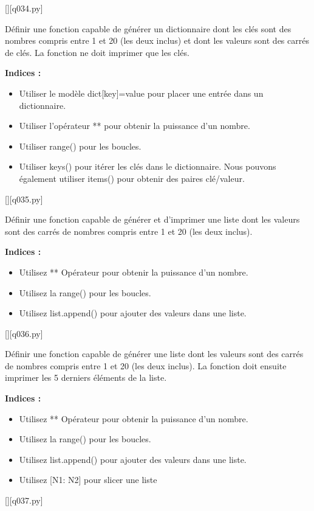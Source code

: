 \renewcommand{\nomfichier}{q034.py}
\begin{solution}
    \pythonfile{\chemincode \nomfichier}[][\nomfichier]
\end{solution}

\question
Définir une fonction capable de générer un dictionnaire dont les clés sont des nombres compris entre 1 et 20 (les deux inclus) et dont les valeurs sont des carrés de clés. La fonction ne doit imprimer que les clés.
\par
\textbf{Indices : }
\begin{itemize}
	\item Utiliser le modèle dict[key]=value pour placer une entrée dans un dictionnaire.
	\item Utiliser l'opérateur ** pour obtenir la puissance d'un nombre.
	\item Utiliser range() pour les boucles.
	\item Utiliser keys() pour itérer les clés dans le dictionnaire. Nous pouvons également utiliser items() pour obtenir des paires clé/valeur.
\end{itemize}
\renewcommand{\nomfichier}{q035.py}
\begin{solution}
    \pythonfile{\chemincode \nomfichier}[][\nomfichier]
\end{solution}

\question
Définir une fonction capable de générer et d'imprimer une liste dont les valeurs sont des carrés de nombres compris entre 1 et 20 (les deux inclus).
\par
\textbf{Indices : }
\begin{itemize}
	\item Utilisez ** Opérateur pour obtenir la puissance d'un nombre.
	\item Utilisez la range() pour les boucles.
	\item Utilisez list.append() pour ajouter des valeurs dans une liste.
\end{itemize}
\renewcommand{\nomfichier}{q036.py}
\begin{solution}
    \pythonfile{\chemincode \nomfichier}[][\nomfichier]
\end{solution}

\question
Définir une fonction capable de générer une liste dont les valeurs sont des carrés de nombres compris entre 1 et 20 (les deux inclus). La fonction doit ensuite imprimer les 5 derniers éléments de la liste.
\par
\textbf{Indices : }
\begin{itemize}
	\item Utilisez ** Opérateur pour obtenir la puissance d'un nombre.
	\item Utilisez la range() pour les boucles.
	\item Utilisez list.append() pour ajouter des valeurs dans une liste.
	\item Utilisez [N1: N2] pour slicer une liste
\end{itemize}
\renewcommand{\nomfichier}{q037.py}
\begin{solution}
    \pythonfile{\chemincode \nomfichier}[][\nomfichier]
\end{solution}

